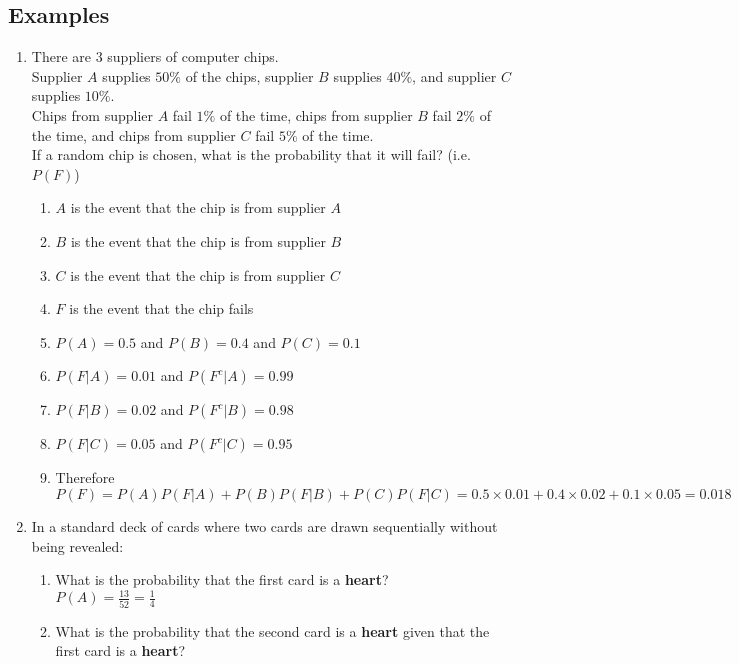 \documentclass[12pt]{article}
\begin{document}
        \subsection{Examples}
            \begin{enumerate}
                \item There are $3$ suppliers of computer chips.
                \\Supplier $A$ supplies $50\%$ of the chips, supplier $B$ supplies $40\%$, and supplier $C$ supplies $10\%$.
                \\Chips from supplier $A$ fail $1\%$ of the time, chips from supplier $B$ fail $2\%$ of the time, and chips from supplier $C$ fail $5\%$ of the time.
                \\If a random chip is chosen, what is the probability that it will fail? (i.e. $P(F)$)
                \begin{enumerate}
                    \item $A$ is the event that the chip is from supplier $A$
                    \item $B$ is the event that the chip is from supplier $B$
                    \item $C$ is the event that the chip is from supplier $C$
                    \item $F$ is the event that the chip fails
                    \item $P(A) = 0.5$ and $P(B) = 0.4$ and $P(C) = 0.1$
                    \item $P(F|A) = 0.01$ and $P(F^c|A) = 0.99$
                    \item $P(F|B) = 0.02$ and $P(F^c|B) = 0.98$
                    \item $P(F|C) = 0.05$ and $P(F^c|C) = 0.95$
                    \item Therefore $P(F) = P(A)P(F|A) + P(B)P(F|B) + P(C)P(F|C) = 0.5\times0.01 + 0.4\times0.02 + 0.1\times0.05 = 0.018$
                \end{enumerate}
                \item In a standard deck of cards where two cards are drawn sequentially without being revealed:
                \begin{enumerate}
                    \item What is the probability that the first card is a \textbf{heart}?
                    \\$P (A) = \frac{13}{52} = \frac{1}{4}$
                    \item What is the probability that the second card is a \textbf{heart} given that the first card is a \textbf{heart}?

\end{enumerate}
\end{enumerate}
\end{document}
